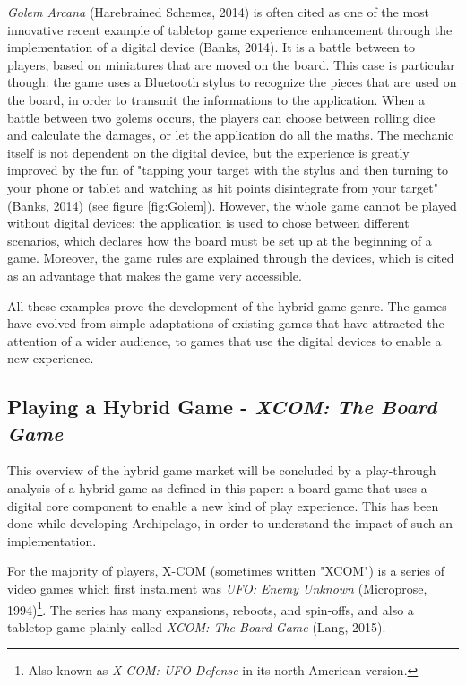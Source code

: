 \textit{Golem Arcana} (Harebrained Schemes, 2014)\cite{game:golem} is often cited as one of the most innovative recent example of tabletop game experience enhancement through the implementation of a digital device (Banks, 2014)\cite{web:golem}. It is a battle between to players, based on miniatures that are moved on the board. This case is particular though: the game uses a Bluetooth stylus to recognize the pieces that are used on the board, in order to transmit the informations to the application. When a battle between two golems occurs, the players can choose between rolling dice and calculate the damages, or let the application do all the maths. The mechanic itself is not dependent on the digital device, but the experience is greatly improved by the fun of "tapping your target with the stylus and then turning to your phone or tablet and watching as hit points disintegrate from your target" (Banks, 2014)\cite{web:golem} (see figure \ref{fig:Golem}). However, the whole game cannot be played without digital devices: the application is used to chose between different scenarios, which declares how the board must be set up at the beginning of a game. Moreover, the game rules are explained through the devices, which is cited as an advantage that makes the game very accessible.

All these examples prove the development of the hybrid game genre. The games have evolved from simple adaptations of existing games that have attracted the attention of a wider audience, to games that use the digital devices to enable a new experience. 

\subsection{Playing a Hybrid Game - \textit{XCOM: The Board Game}}
This overview of the hybrid game market will be concluded by a play-through analysis of a hybrid game as defined in this paper: a board game that uses a digital core component to enable a new kind of play experience. This has been done while developing Archipelago, in order to understand the impact of such an implementation.

For the majority of players, X-COM (sometimes written "XCOM") is a series of video games which first instalment was \textit{UFO: Enemy Unknown}\cite{game:xcom} (Microprose, 1994)\footnote{Also known as \textit{X-COM: UFO Defense} in its north-American version.}. The series has many expansions, reboots, and spin-offs, and also a tabletop game plainly called \textit{XCOM: The Board Game} (Lang, 2015)\cite{game:xcomtbg}.

